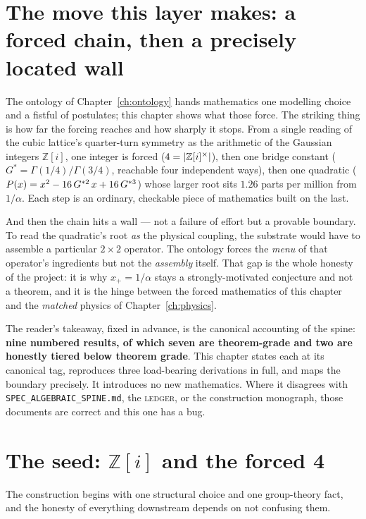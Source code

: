 \section*{The move this layer makes: a forced chain, then a precisely located wall}

The ontology of Chapter~\ref{ch:ontology} hands mathematics one modelling
choice and a fistful of postulates; this chapter shows what those force. The
striking thing is how far the forcing reaches and how sharply it stops. From a
single reading of the cubic lattice's quarter-turn symmetry as the arithmetic
of the Gaussian integers $\mathbb{Z}[i]$, one integer is forced ($4=|\mathbb{Z}[i]^{\times}|$),
then one bridge constant ($G^{*}=\Gamma(1/4)/\Gamma(3/4)$, reachable four
independent ways), then one quadratic
($P(x)=x^{2}-16\,G^{*2}\,x+16\,G^{*3}$) whose larger root sits $1.26$ parts per
million from $1/\alpha$. Each step is an ordinary, checkable piece of
mathematics built on the last.

And then the chain hits a wall --- not a failure of effort but a provable
boundary. To read the quadratic's root \emph{as} the physical coupling, the
substrate would have to assemble a particular $2\times 2$ operator. The
ontology forces the \emph{menu} of that operator's ingredients but not the
\emph{assembly} itself. That gap is the whole honesty of the project: it is why
$x_+ = 1/\alpha$ stays a strongly-motivated conjecture and not a theorem, and
it is the hinge between the forced mathematics of this chapter and the
\emph{matched} physics of Chapter~\ref{ch:physics}.

The reader's takeaway, fixed in advance, is the canonical accounting of the
spine: \textbf{nine numbered results, of which seven are theorem-grade and two
are honestly tiered below theorem grade}. This chapter states each at its
canonical tag, reproduces three load-bearing derivations in full, and maps the
boundary precisely. It introduces no new mathematics. Where it disagrees with
\texttt{SPEC\_ALGEBRAIC\_SPINE.md}, the \textsc{ledger}, or the construction
monograph, those documents are correct and this one has a bug.

\section{The seed: \texorpdfstring{$\mathbb{Z}[i]$}{Z[i]} and the forced 4}
\label{sec:math-seed}

The construction begins with one structural choice and one group-theory fact,
and the honesty of everything downstream depends on not confusing them.

